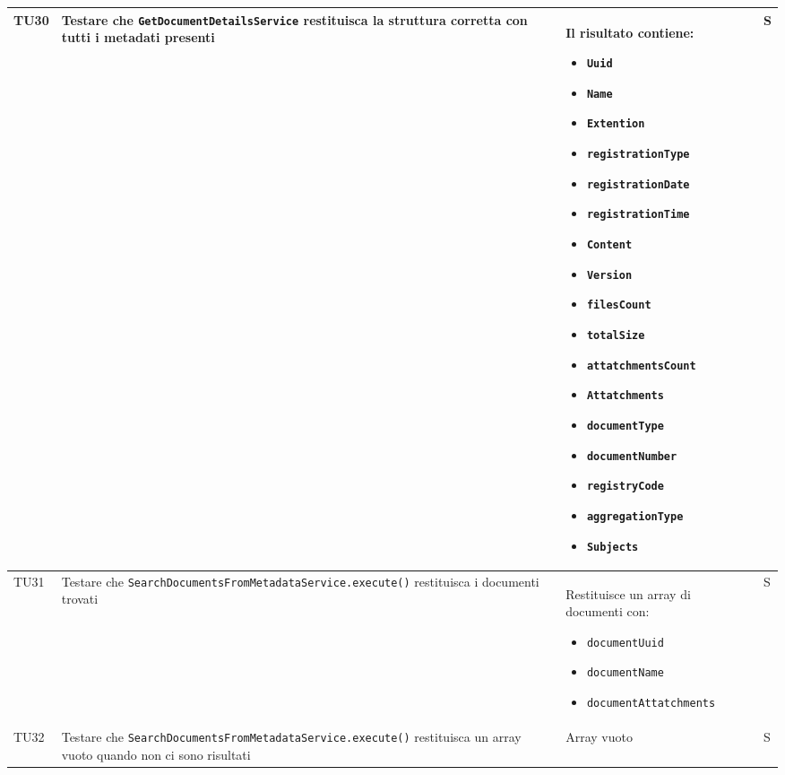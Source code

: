 \documentclass[a4paper,12pt]{article}
\begin{document}
\begin{longtable}{|M{1.2cm}|M{5cm}|M{5cm}|M{1.5cm}|}
            TU30 & Testare che \texttt{GetDocumentDetailsService} restituisca la struttura corretta con tutti i metadati presenti & Il risultato contiene:
            \begin{itemize}[leftmargin=*]
                \item \texttt{Uuid}
                \item \texttt{Name}
                \item \texttt{Extention}
                \item \texttt{registrationType}
                \item \texttt{registrationDate}
                \item \texttt{registrationTime}
                \item \texttt{Content}
                \item \texttt{Version}
                \item \texttt{filesCount}
                \item \texttt{totalSize}
                \item \texttt{attatchmentsCount}
                \item \texttt{Attatchments}
                \item \texttt{documentType}
                \item \texttt{documentNumber}
                \item \texttt{registryCode}
                \item \texttt{aggregationType}
                \item \texttt{Subjects}
            \end{itemize} & S \\
            \hline

            TU31 & Testare che \texttt{SearchDocumentsFromMetadataService.execute()} restituisca i documenti trovati & Restituisce un array di documenti con:
            \begin{itemize}[leftmargin=*]
                \item \texttt{documentUuid}
                \item \texttt{documentName}
                \item \texttt{documentAttatchments}
            \end{itemize} & S \\
            \hline

            TU32 & Testare che \texttt{SearchDocumentsFromMetadataService.execute()} restituisca un array vuoto quando non ci sono risultati & Array vuoto & S \\
            \hline


\end{longtable}
\end{document}
